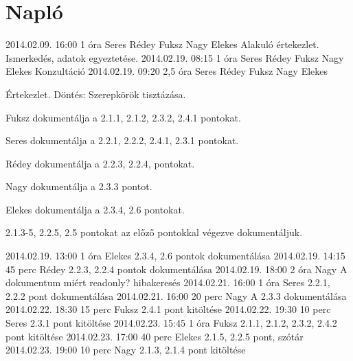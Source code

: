 %
\section{Napló}

\begin{naplo}

\bejegyzes
{2014.02.09. 16:00}
{1 óra}
{Seres
Rédey
Fuksz
Nagy
Elekes}
{Alakuló értekezlet.
Ismerkedés, adatok egyeztetése.}
\bejegyzes
{2014.02.19. 08:15}
{1 óra}
{Seres 
Rédey
Fuksz
Nagy
Elekes}
{Konzultáció}
\bejegyzes
{2014.02.19. 09:20}
{2,5 óra}
{Seres 
Rédey
Fuksz
Nagy
Elekes}
{Értekezlet. Döntés: Szerepkörök tisztázása. 

Fuksz dokumentálja a 2.1.1, 2.1.2, 2.3.2, 2.4.1 pontokat. 

Seres dokumentálja a 2.2.1, 2.2.2, 2.4.1, 2.3.1 pontokat. 

Rédey dokumentálja a 2.2.3, 2.2.4, pontokat. 

Nagy dokumentálja a 2.3.3 pontot. 

Elekes dokumentálja a 2.3.4, 2.6 pontokat. 

2.1.3-5, 2.2.5, 2.5 pontokat az előző pontokkal végezve dokumentáljuk.}
\bejegyzes
{2014.02.19. 13:00}
{1 óra}
{Elekes}
{2.3.4, 2.6 pontok dokumentálása}
\bejegyzes
{2014.02.19. 14:15}
{45 perc}
{Rédey}
{2.2.3, 2.2.4 pontok dokumentálása}
\bejegyzes
{2014.02.19. 18:00}
{2 óra}
{Nagy}
{A dokumentum miért readonly? hibakeresés}
\bejegyzes
{2014.02.21. 16:00}
{1 óra}
{Seres}
{2.2.1, 2.2.2 pont dokumentálása}
\bejegyzes
{2014.02.21. 16:00}
{20 perc}
{Nagy}
{A 2.3.3 dokumentálása}
\bejegyzes
{2014.02.22. 18:30}
{15 perc}
{Fuksz}
{2.4.1 pont kitöltése}
\bejegyzes
{2014.02.22. 19:30}
{10 perc}
{Seres}
{2.3.1 pont kitöltése}		
\bejegyzes
{2014.02.23. 15:45}
{1 óra}
{Fuksz}
{2.1.1, 2.1.2, 2.3.2, 2.4.2 pont kitöltése}
\bejegyzes
{2014.02.23. 17:00}
{40 perc}
{Elekes}
{2.1.5, 2.2.5 pont, szótár}
\bejegyzes
{2014.02.23. 19:00}
{10 perc}
{Nagy}
{2.1.3, 2.1.4 pont kitöltése}
		

\end{naplo}

